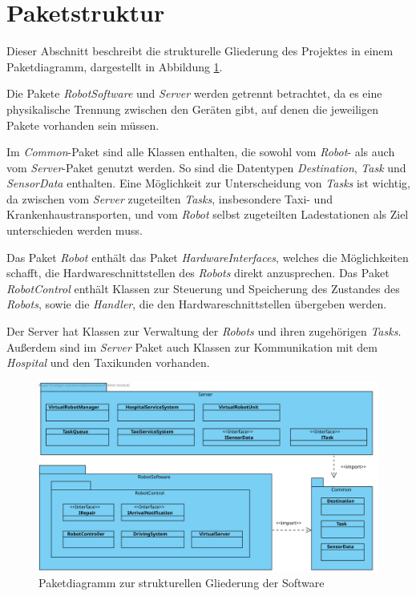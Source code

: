 \section{Paketstruktur}
Dieser Abschnitt beschreibt die strukturelle Gliederung des Projektes in einem Paketdiagramm, dargestellt in Abbildung \ref{Paketstruktur}.

Die Pakete \textit{RobotSoftware} und \textit{Server} werden getrennt betrachtet, da es eine physikalische Trennung zwischen den Geräten gibt, auf denen die jeweiligen Pakete vorhanden sein müssen.

Im \textit{Common}-Paket sind alle Klassen enthalten, die sowohl vom \textit{Robot}- als auch vom \textit{Server}-Paket genutzt werden. 
So sind die Datentypen \textit{Destination}, \textit{Task} und \emph{SensorData} enthalten. 
Eine Möglichkeit zur Unterscheidung von \textit{Tasks} ist wichtig, da zwischen vom \textit{Server} zugeteilten \textit{Tasks}, insbesondere Taxi- und Krankenhaustransporten, und vom \textit{Robot} selbst zugeteilten Ladestationen als Ziel unterschieden werden muss. 

Das Paket \textit{Robot} enthält das Paket \textit{HardwareInterfaces}, welches die Möglichkeiten schafft, die Hardwareschnittstellen des \textit{Robots} direkt anzusprechen. 
Das Paket \textit{RobotControl} enthält Klassen zur Steuerung und Speicherung des Zustandes des \textit{Robots}, sowie die \emph{Handler}, die den Hardwareschnittstellen übergeben werden.

Der Server hat Klassen zur Verwaltung der \textit{Robots} und ihren zugehörigen \textit{Tasks}. 
Außerdem sind im \textit{Server} Paket auch Klassen zur Kommunikation mit dem \textit{Hospital} und den Taxikunden vorhanden.

\begin{figure}[H]
\centering
\includegraphics[height=0.8\textwidth, angle=90]{img/6_paketdiagramm}
\caption{Paketdiagramm zur strukturellen Gliederung der Software}
\label{Paketstruktur}
\end{figure}
